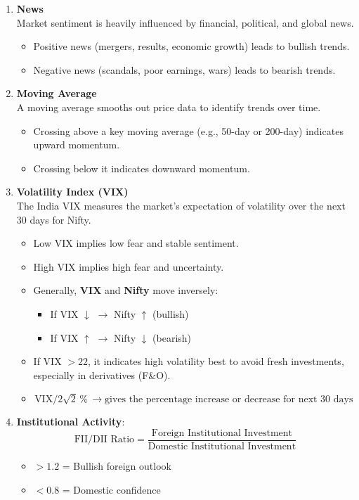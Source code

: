 \documentclass[12pt]{article}
\begin{document}
\begin{enumerate}
    \item \textbf{News}\\
    Market sentiment is heavily influenced by financial, political, and global news.
    \begin{itemize}
        \item Positive news (mergers, results, economic growth) leads to bullish trends.
        \item Negative news (scandals, poor earnings, wars) leads to bearish trends.
    \end{itemize}

    \item \textbf{Moving Average}\\
    A moving average smooths out price data to identify trends over time.
    \begin{itemize}
        \item Crossing above a key moving average (e.g., 50-day or 200-day) indicates upward momentum.
        \item Crossing below it indicates downward momentum.
    \end{itemize}

    \item \textbf{Volatility Index (VIX)}\\
    The India VIX measures the market's expectation of volatility over the next 30 days for Nifty.
    \begin{itemize}
        \item Low VIX implies low fear and stable sentiment.
        \item High VIX implies high fear and uncertainty.
        \item Generally, \textbf{VIX} and \textbf{Nifty} move inversely:
        \begin{itemize}
            \item If VIX $\downarrow$ $\rightarrow$ Nifty $\uparrow$ (bullish)
            \item If VIX $\uparrow$ $\rightarrow$ Nifty $\downarrow$ (bearish)
        \end{itemize}
        \item If VIX $> 22$, it indicates high volatility best to avoid fresh investments, especially in derivatives (F\&O).
        \item \[\text{VIX} / 2\sqrt{2} \, \% \, \rightarrow \text{gives the percentage increase or decrease for next 30 days}\]
    \end{itemize}

    \item \textbf{Institutional Activity}:
    \[
    \text{FII/DII Ratio} = \frac{\text{Foreign Institutional Investment}}{\text{Domestic Institutional Investment}}
    \]
    \begin{itemize}
        \item $>1.2$ = Bullish foreign outlook
        \item $<0.8$ = Domestic confidence
    \end{itemize}


\end{enumerate}
\end{document}
